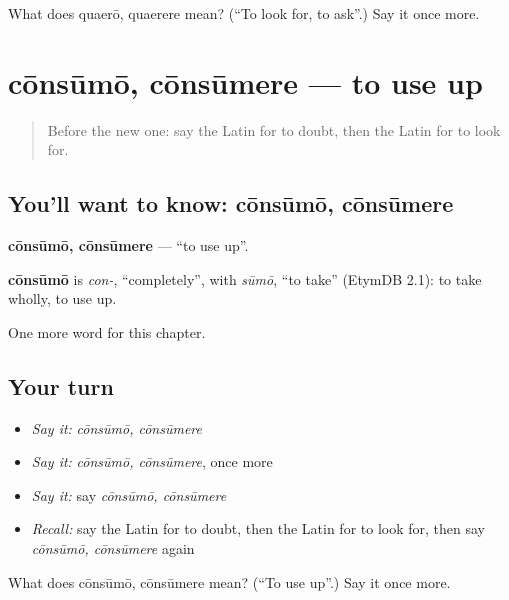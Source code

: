 \begin{tcolorbox}[breakable,colback=teal!4,colframe=teal!35!black,title={Before you move on}]
What does quaerō, quaerere mean? (\textquotedblleft{}To look for, to ask\textquotedblright{}.) Say it once more.
\end{tcolorbox}
\section[cōnsūmō, cōnsūmere]{cōnsūmō, cōnsūmere — to use up}

\label{lesson:LA-C203-consumo}



\begin{quote}
Before the new one: say the Latin for to doubt, then the Latin for to look for.
\end{quote}

\subsection*{You'll want to know: cōnsūmō, cōnsūmere}
\textbf{cōnsūmō, cōnsūmere} — \textquotedblleft{}to use up\textquotedblright{}.

\begin{cousinweb}
\textbf{cōnsūmō} is \emph{con-}, \textquotedblleft{}completely\textquotedblright{}, with \emph{sūmō}, \textquotedblleft{}to take\textquotedblright{} (EtymDB 2.1): to take wholly, to use up.
\end{cousinweb}

\begin{grammarlens}[title={What you've built}]
One more word for this chapter.
\end{grammarlens}

\subsection*{Your turn}
\begin{itemize}
\raggedright
  \item \emph{Say it:} \emph{cōnsūmō, cōnsūmere}
  \item \emph{Say it:} \emph{cōnsūmō, cōnsūmere}, once more
  \item \emph{Say it:} say \emph{cōnsūmō, cōnsūmere}
  \item \emph{Recall:} say the Latin for to doubt, then the Latin for to look for, then say \emph{cōnsūmō, cōnsūmere} again
\end{itemize}

\begin{tcolorbox}[breakable,colback=teal!4,colframe=teal!35!black,title={Before you move on}]
What does cōnsūmō, cōnsūmere mean? (\textquotedblleft{}To use up\textquotedblright{}.) Say it once more.
\end{tcolorbox}
